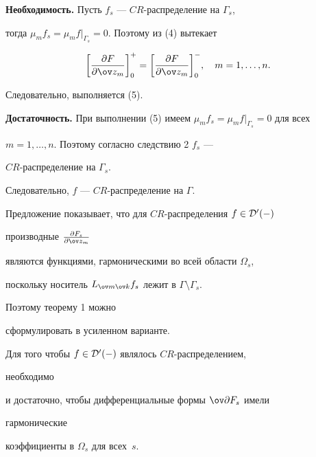  


\begin{pf} 


{\bf Необходимость.} Пусть $f_s$ --- $CR$-распределение на $\Gamma_s$, 


тогда $\mu_m f_s=\mu_m f\big|_{\Gamma_s}=0$. Поэтому из (4) вытекает 


$$ 


\bigg[\frac{\partial F}{\partial \ov z_m}\bigg]^+_0= 


\bigg[\frac{\partial F}{\partial \ov z_m}\bigg]^-_0,\quad 


m=1,\dotsc,n. 


$$ 


Следовательно, выполняется (5). 


\smallskip 


 


{\bf Достаточность.} При выполнении (5) имеем $\mu_m f_s=\mu_m 


f\big|_{\Gamma_s}=0$ для всех 


$m=1,\dotsc,n$. Поэтому согласно следствию 2\; $f_s$ --- 


$CR$-распределение на $\Gamma_s$. 


Следовательно, $f$ --- $CR$-распределение на $\Gamma$. 


\end{pf} 


 


Предложение показывает, что для $CR$-распределения $f\in\cal D'(\Gamma)$ 


производные $\frac{\partial F_s}{\partial \ov z_m}$ 


являются функциями, гармоническими во всей области $\Omega_s$, 


поскольку носитель $L_{\ov m\ov k}f_s$ лежит в $\Gamma\setminus\Gamma_s$. 


Поэтому теорему 1 можно 


сформулировать в усиленном варианте. 


 


\begin{thm} 


Для того чтобы $f\in\cal D'(\Gamma)$ являлось $CR$-распределением, 


необходимо 


и достаточно, чтобы дифференциальные формы $\ov\partial F_s$ имели 


гармонические 


коэффициенты в $\Omega_s$ для всех~$s$. 


\end{thm} 


